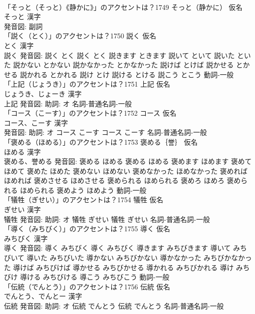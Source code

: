 \documentclass[8pt]{extreport}
\begin{document}
\begin{CJK}{UTF8}{min}
\\	「そっと（そっと）《静かに》」のアクセントは？1749	そっと（静かに） 仮名　
\\	そっと 漢字　
\\	発音図:							副詞 
\\	「説く（とく）」のアクセントは？1750	説く 仮名　
\\	とく 漢字　
\\	説く 発音図:	説く とく		説く とく 説きます ときます 説いて といて 説いた といた 説かない とかない 説かなかった とかなかった 説けば とけば 説かせる とかせる 説かれる とかれる 説け とけ 説ける とける 説こう とこう				動詞-一般 
\\	「上記（じょうき）」のアクセントは？1751	上記 仮名　
\\	じょうき、じょーき 漢字　
\\	上記 発音図: 助詞: オ							名詞-普通名詞-一般 
\\	「コース（こーす）」のアクセントは？1752	コース 仮名　
\\	コース、こーす 漢字　
\\	発音図: 助詞: オ	コース こーす		コース こーす				名詞-普通名詞-一般 
\\	「褒める（ほめる）」のアクセントは？1753	褒める｛誉｝ 仮名　
\\	ほめる 漢字　
\\	褒める、誉める 発音図:	褒める ほめる		褒める ほめる 褒めます ほめます 褒めて ほめて 褒めた ほめた 褒めない ほめない 褒めなかった ほめなかった 褒めれば ほめれば 褒めさせる ほめさせる 褒められる ほめられる 褒めろ ほめろ 褒められる ほめられる 褒めよう ほめよう				動詞-一般 
\\	「犠牲（ぎせい）」のアクセントは？1754	犠牲 仮名　
\\	ぎせい 漢字　
\\	犠牲 発音図: 助詞: オ	犠牲 ぎせい		犠牲 ぎせい				名詞-普通名詞-一般 
\\	「導く（みちびく）」のアクセントは？1755	導く 仮名　
\\	みちびく 漢字　
\\	導く 発音図:	導く みちびく		導く みちびく 導きます みちびきます 導いて みちびいて 導いた みちびいた 導かない みちびかない 導かなかった みちびかなかった 導けば みちびけば 導かせる みちびかせる 導かれる みちびかれる 導け みちびけ 導ける みちびける 導こう みちびこう				動詞-一般 
\\	「伝統（でんとう）」のアクセントは？1756	伝統 仮名　
\\	でんとう、でんとー 漢字　
\\	伝統 発音図: 助詞: オ	伝統 でんとう		伝統 でんとう				名詞-普通名詞-一般 

\end{CJK}
\end{document}
